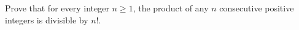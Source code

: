 Prove that for every integer $n\ge1$, the product of any $n$ consecutive positive integers is divisible by $n!$.
